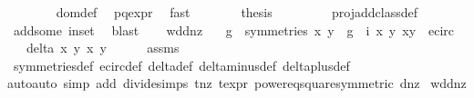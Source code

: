 \begin{isabellebody}
\ \ \ \ \ \ \isamarkupfalse%
\ dom{\isacharunderscore}def\ \isamarkupfalse%
\ p{\isacharunderscore}q{\isacharunderscore}expr\ \isamarkupfalse%
\ fast\isanewline
\ \ \ \ \isamarkupfalse%
\ \isamarkupfalse%
\ {\isacharquery}thesis\ \isanewline
\ \ \ \ \ \ \isamarkupfalse%
\ proj{\isacharunderscore}add{\isacharunderscore}class{\isacharunderscore}def\ \isanewline
\ \ \ \ \ \ \isamarkupfalse%
\ add{\isacharunderscore}some\ in{\isacharunderscore}set\ \isamarkupfalse%
\ blast\isanewline
\ \ \isamarkupfalse%
\isanewline
{}\isamarkupfalse%
%
\endisatagproof
{\isafoldproof}%
%
\isadelimproof
\isanewline
%
\endisadelimproof
\isanewline
{}\isamarkupfalse%
\ wd{\isacharunderscore}d{\isacharunderscore}nz{\isacharcolon}\isanewline
\ \ \ {\isachardoublequoteopen}g\ {\isasymin}\ symmetries{\isachardoublequoteclose}\ {\isachardoublequoteopen}{\isacharparenleft}x{\isacharprime}{\isacharcomma}\ y{\isacharprime}{\isacharparenright}\ {\isacharequal}\ {\isacharparenleft}g\ {\isasymcirc}\ i{\isacharparenright}\ {\isacharparenleft}x{\isacharcomma}\ y{\isacharparenright}{\isachardoublequoteclose}\ {\isachardoublequoteopen}{\isacharparenleft}x{\isacharcomma}y{\isacharparenright}\ {\isasymin}\ e{\isacharunderscore}circ{\isachardoublequoteclose}\isanewline
\ \ \ {\isachardoublequoteopen}delta\ x\ y\ x{\isacharprime}\ y{\isacharprime}\ {\isacharequal}\ {}{\isachardoublequoteclose}\isanewline
%
\isadelimproof
\ \ %
\endisadelimproof
%
\isatagproof
{}\isamarkupfalse%
\ assms\ \isamarkupfalse%
\ symmetries{\isacharunderscore}def\ e{\isacharunderscore}circ{\isacharunderscore}def\ delta{\isacharunderscore}def\ delta{\isacharunderscore}minus{\isacharunderscore}def\ delta{\isacharunderscore}plus{\isacharunderscore}def\isanewline
\ \ \isamarkupfalse%
{\isacharparenleft}auto{\isacharcomma}auto\ simp\ add{\isacharcolon}\ divide{\isacharunderscore}simps\ t{\isacharunderscore}nz\ t{\isacharunderscore}expr{\isacharparenleft}{}{\isacharparenright}\ power{}{\isacharunderscore}eq{\isacharunderscore}square{\isacharbrackleft}symmetric{\isacharbrackright}\ d{\isacharunderscore}nz{\isacharparenright}%
\endisatagproof
{\isafoldproof}%
%
\isadelimproof
\isanewline
%
\endisadelimproof
\isanewline
{}\isamarkupfalse%
\ wd{\isacharunderscore}d{\isacharprime}{\isacharunderscore}nz{\isacharcolon}\isanewline

\end{isabellebody}
